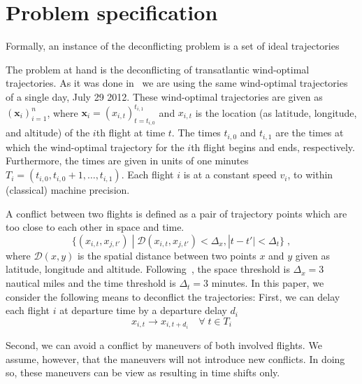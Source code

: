 \section{Problem specification}

Formally, an instance of the deconflicting problem is a set of ideal trajectories  

The problem at hand is the deconflicting of transatlantic wind-optimal trajectories.
As it was done in~\cite{rodionova16} we are using the same wind-optimal trajectories of a single day, July 29 2012.
These wind-optimal trajectories are given as
${\left(\mathbf{x}_i\right)}_{i=1}^n$, 
where 
$\mathbf{x}_i = {\left(x_{i,t}\right)}_{t=t_{i,0}}^{t_{i,1}}$ 
and 
$x_{i, t}$ is the location (as latitude, longitude, and altitude) of the $i$th flight at time $t$.
The times $t_{i,0}$ and $t_{i, 1}$ are the times at which the wind-optimal trajectory for the $i$th flight begins and ends, respectively.
Furthermore, the times are given in units of one minutes $T_i = \left(t_{i, 0}, t_{i, 0} + 1, \ldots, t_{i, 1}\right)$.
Each flight $i$ is at a constant speed $v_i$, to within (classical) machine precision.

A conflict between two flights is defined as a pair of trajectory points which are too close to each other in space and time.
\begin{equation} \label{eqn:conflicting_trajectory_points}
    \{ (x_{i, t},  x_{j, t'}) \; | \; \mathcal{D} (x_{i, t}, x_{j, t'}) < \Delta_x ,  |t - t'| < \Delta_t \} \; ,
\end{equation}
where $\mathcal{D}(x, y)$ is the spatial distance between two points $x$ and $y$ given as latitude, longitude and altitude.
Following~\cite{rodionova16}, the space threshold is $\Delta_x = 3$ nautical miles and the time threshold is $\Delta_t = 3$ minutes.
In this paper, we consider the following means to deconflict the trajectories:
First, we can delay each flight $i$ at departure time by a departure delay $d_i$
\begin{equation*}
    x_{i, t} \to x_{i, t + d_i} \quad \forall \; t \in T_{i}
\end{equation*}

Second, we can avoid a conflict by maneuvers of both involved flights.
We assume, however, that the maneuvers will not introduce new conflicts. 
In doing so, these maneuvers can be view as resulting in time shifts only.

